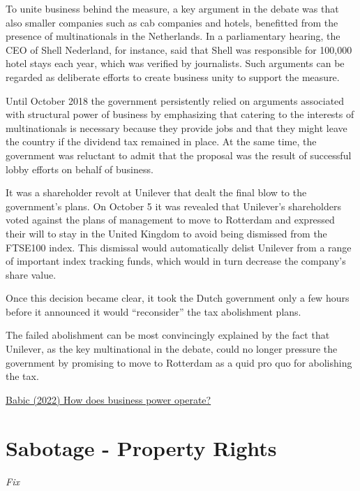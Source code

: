 \documentclass[
]{book}
\begin{document}
To unite business behind the measure, a key argument in the debate was that also smaller companies such as cab companies and hotels, benefitted from the presence of multinationals in the Netherlands. In a parliamentary hearing, the CEO of Shell Nederland, for instance, said that Shell was responsible for 100,000 hotel stays each year, which was verified by journalists. Such arguments can be regarded as deliberate efforts to create business unity to support the measure.

Until October 2018 the government persistently relied on arguments associated with structural power of business by emphasizing that catering to the interests of multinationals is necessary because they provide jobs and that they might leave the country if the dividend tax remained in place.
At the same time, the government was reluctant to admit that the proposal was the result of successful lobby efforts on behalf of business.

It was a shareholder revolt at Unilever that dealt the final blow to the government's plans. On October 5 it was revealed that Unilever's shareholders voted against the plans of management to move to Rotterdam and expressed their will to stay in the United Kingdom to avoid being dismissed from the FTSE100 index. This dismissal would automatically delist Unilever from a range of important index tracking funds, which would in turn decrease the company's share value.

Once this decision became clear, it took the Dutch government only a few hours before it announced it would ``reconsider'' the tax abolishment plans.

The failed abolishment can be most convincingly explained by the fact that Unilever, as the key multinational in the debate, could no longer pressure the government by promising to move to Rotterdam as a quid pro quo for abolishing the tax.

\href{https://www.cambridge.org/core/journals/business-and-politics/article/how-does-business-power-operate-a-framework-for-its-working-mechanisms/6F918ABDEC85B651BBB41026D8E890C5}{Babic (2022) How does business power operate?}

\hypertarget{sabotage---property-rights}{%
\section{Sabotage - Property Rights}\label{sabotage---property-rights}}

\emph{Fix}
\end{document}
